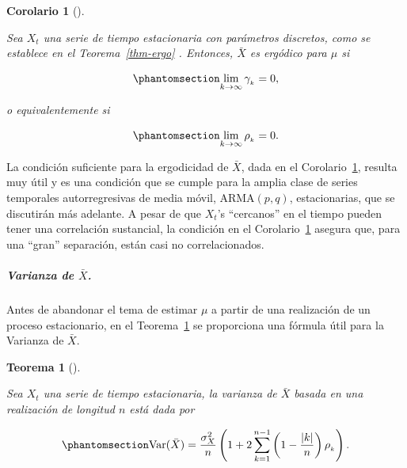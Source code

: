 \documentclass[
  us-letterpaper,
]{scrreprt}
\let\oldsubparagraph\subparagraph
\renewcommand{\subparagraph}[1]{\oldsubparagraph{#1}\mbox{}}
\theoremstyle{plain}
\newtheorem{theorem}{Teorema}[chapter]
\theoremstyle{definition}
\theoremstyle{definition}
\theoremstyle{plain}
\newtheorem{corollary}{Corolario}[chapter]
\theoremstyle{remark}
\begin{document}
\begin{corollary}[]\protect\hypertarget{cor-ergo}{}\label{cor-ergo}

Sea \(X_t\) una serie de tiempo estacionaria con parámetros discretos,
como se establece en el Teorema~\ref{thm-ergo} . Entonces, \(\bar X\) es
ergódico para \(\mu\) si

\begin{equation}\phantomsection\label{eq-ergo1}{
\lim\limits_{k\to\infty} \gamma_{_k}=0,
}\end{equation}

o equivalentemente si

\begin{equation}\phantomsection\label{eq-ergo2}{
\lim\limits_{k\to\infty} \rho_{_k}=0.
}\end{equation}

\end{corollary}

La condición suficiente para la ergodicidad de \(\bar X\), dada en el
Corolario~\ref{cor-ergo}, resulta muy útil y es una condición que se
cumple para la amplia clase de series temporales autorregresivas de
media móvil, ARMA\((p,q)\), estacionarias, que se discutirán más
adelante. A pesar de que \(X_t\)'s ``cercanos'' en el tiempo pueden
tener una correlación sustancial, la condición en el
Corolario~\ref{cor-ergo} asegura que, para una ``gran'' separación,
están casi no correlacionados.

\subparagraph{\texorpdfstring{Varianza de
\(\bar X\).}{Varianza de \textbackslash bar X.}}\label{varianza-de-bar-x.}

Antes de abandonar el tema de estimar \(\mu\) a partir de una
realización de un proceso estacionario, en el Teorema~\ref{thm-varmedia}
se proporciona una fórmula útil para la Varianza de \(\bar X\).

\begin{theorem}[]\protect\hypertarget{thm-varmedia}{}\label{thm-varmedia}

Sea \(X_t\) una serie de tiempo estacionaria, la varianza de \(\bar X\)
basada en una realización de longitud \(n\) está dada por

\begin{equation}\phantomsection\label{eq-varmedia}{
\mathrm{Var}(\bar X)=\frac{\sigma_X^2}{n}\left(1+2\sum_{k=1}^{n-1}\left(1-\frac{|k|}{n}\right)\rho_{_k}\right).
}\end{equation}

\end{theorem}
\end{document}
